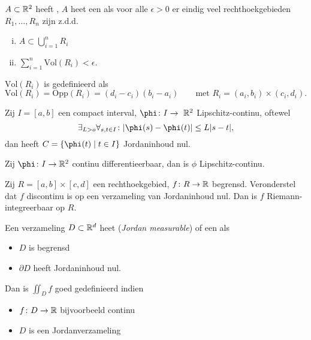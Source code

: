 \documentclass{2wa40summary}
\newcommand\ds{\displaystyle}
\begin{document}
		\begin{define}
			$ A \subset \mathbb{R}^2 $ heeft , $A$ heet een  als voor alle $ \epsilon > 0 $ er eindig veel rechthoekgebieden $ R_1, \ldots, R_n $ zijn z.d.d.
			\begin{enumerate}[(i)]
				\item $ A \subset \ds\bigcup_{i=1}^n R_i $
				\item $ \ds\sum_{i=1}^n \text{Vol}(R_i) < \epsilon $.
			\end{enumerate}
			$ \text{Vol}(R_i) $ is gedefinieerd als 
			\[ 
				\text{Vol}(R_i)=\text{Opp}(R_i) = (d_i-c_i)(b_i-a_i) \qquad \text{met } R_i = (a_i,b_i) \times (c_i,d_i). 
			\]	 
		\end{define}
		
	    \begin{theorem}
	    	Zij $ I=[a,b] $ een compact interval, $ \phi \: I \to~\reals^2 $ Lipschitz-continu, oftewel
	    	\[ 
		    	\exists_{L>o} \forall_{s,t \in I} \: \abs{\phi (s) - \phi (t)} \leq L \abs{s-t} ,
	    	 \]
	    	 dan heeft $ C = \set{\phi (t) \mid t \in I} $ Jordaninhoud nul.
	    \end{theorem}
	    
	    \begin{opm}
	    	Zij $ \phi \: I \to \reals^2 $ continu differentieerbaar, dan is $\phi$ Lipschitz-continu.
	    \end{opm}
	    
	    \begin{theorem}[\text{[K] 11.3.3}]
	    	Zij $ R=[a,b] \times [c,d] $ een rechthoekgebied, $ f \colon R \to \mathbb{R} $ begrensd. Veronderstel dat $f$ discontinu is op een verzameling van Jordaninhoud nul. Dan is $f$ Riemann-integreerbaar op $R$.
	    \end{theorem}
	    
	    \begin{define}
	    	Een verzameling $ D \subset \mathbb{R}^d $ heet  (\textit{Jordan measurable}) of een  als 
	    	\begin{itemize}
	    		\item $D$ is begrensd
	    		\item $\partial D$ heeft Jordaninhoud nul.
	    	\end{itemize}
	    	Dan is $ \iint_D f $ goed gedefinieerd indien  
	    	\begin{itemize}
	    		\item $ f \colon D \to \mathbb{R} $ bijvoorbeeld continu 
	    		\item $D$ is een Jordanverzameling
	    	\end{itemize}
	    \end{define}
	    
\end{document}

